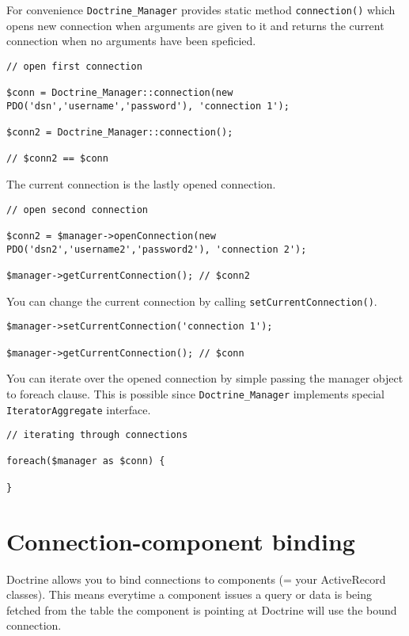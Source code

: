 \documentclass[11pt,a4paper]{report}
\begin{document}
For convenience \texttt{Doctrine\_Manager} provides static method \texttt{connection()} which opens new connection when arguments are given to it and returns the current connection when no arguments have been speficied.

\begin{verbatim}
// open first connection

$conn = Doctrine_Manager::connection(new PDO('dsn','username','password'), 'connection 1');

$conn2 = Doctrine_Manager::connection();

// $conn2 == $conn
\end{verbatim}

The current connection is the lastly opened connection.

\begin{verbatim}
// open second connection

$conn2 = $manager->openConnection(new PDO('dsn2','username2','password2'), 'connection 2');

$manager->getCurrentConnection(); // $conn2
\end{verbatim}

You can change the current connection by calling \texttt{setCurrentConnection()}.

\begin{verbatim}
$manager->setCurrentConnection('connection 1');

$manager->getCurrentConnection(); // $conn
\end{verbatim}

You can iterate over the opened connection by simple passing the manager object to foreach clause. This is possible since \texttt{Doctrine\_Manager} implements special \texttt{IteratorAggregate} interface.

\begin{verbatim}
// iterating through connections

foreach($manager as $conn) {

}
\end{verbatim}

\section{Connection-component binding}
Doctrine allows you to bind connections to components (= your ActiveRecord classes). This means everytime a component issues a query or data is being fetched from the table the component is pointing at Doctrine will use the bound connection.
\end{document}
